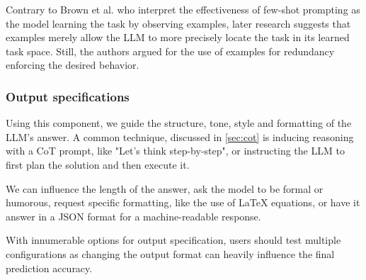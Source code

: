 Contrary to Brown et al.\cite{brown2020languagemodelsfewshotlearners} who interpret the effectiveness of
few-shot prompting as the model learning the task by observing examples, later research\cite{reynolds2021promptprogramminglargelanguage}
suggests that examples merely allow the LLM to more precisely locate the task in its learned task space.
Still, the authors argued for the use of examples for redundancy enforcing the desired behavior\cite{reynolds2021promptprogramminglargelanguage}.

\subsubsection{Output specifications}
Using this component, we guide the structure, tone, style and formatting of the LLM's answer. 
A common technique, discussed in \ref{sec:cot} is inducing reasoning
with a CoT prompt, like "Let's think step-by-step", or instructing the LLM to 
first plan the solution and then execute it. 

We can influence the length of the answer, ask the model to be formal or humorous,
request specific formatting, like the use of \LaTeX{} equations, or have it answer in a JSON format
for a machine-readable response. 

With innumerable options for output specification, users should test multiple configurations as changing the output format
can heavily influence the final prediction accuracy\cite{salinas2024butterflyeffectalteringprompts}.

